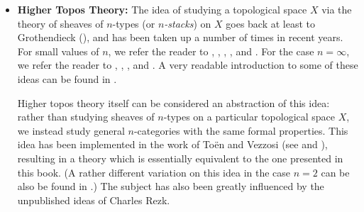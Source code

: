 \begin{itemize}
\item {\bf Higher Topos Theory:} The idea of studying a topological space $X$ via the theory of
sheaves of $n$-types (or {\it $n$-stacks}) on $X$ goes back at least to Grothendieck
(\cite{pursuing}), and has been taken up a number of times in recent years. For small values of
$n$, we refer the reader to \cite{giraud}, \cite{street}, \cite{breen}, \cite{joyaltierney}, and \cite{polesello}. For the case $n=\infty$, we refer the reader to \cite{brown}, \cite{jardine}, \cite{hirschowitz}, and \cite{toen2}.
A very readable introduction to some of these ideas can be found in \cite{baezshul}.

Higher topos theory itself can be considered an abstraction of this idea: rather than studying
sheaves of $n$-types on a particular topological space $X$, we instead study general $n$-categories with the same formal properties. This idea has been implemented in the work of To\"{e}n and Vezzosi
(see \cite{toen} and \cite{toenvezz}), resulting in a theory which is essentially equivalent to
the one presented in this book. (A rather different variation on this idea in the case $n=2$ can
be also be found in \cite{ditopoi}.) The subject has also been greatly influenced by the unpublished ideas of Charles Rezk.
\end{itemize}



